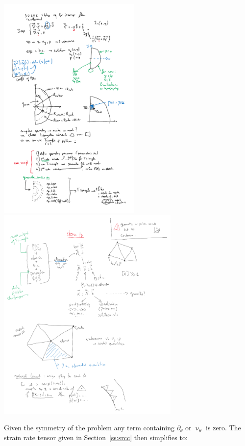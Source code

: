 \begin{center}
\includegraphics[width=7cm]{python_codes/fieldstone_96/images/notes1}\\
\includegraphics[width=9cm]{python_codes/fieldstone_96/images/notes2}
\end{center}

Given the symmetry of the problem any term containing $\partial_\theta$ or $\upnu_\theta$ is zero.
The strain rate tensor given in Section~\ref{ss:srcc} then simplifies to:

